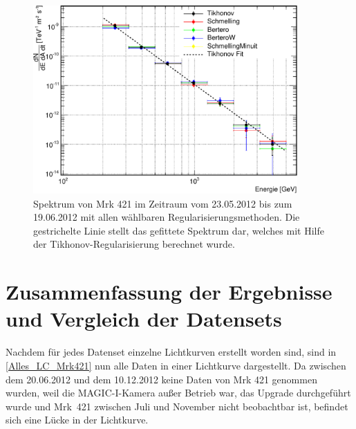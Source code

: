 \begin{figure}
    \centering
    \includegraphics[width=0.9\textwidth]{./Plots/04_MrkAnalyse/Datenset3/Datenset3_Mrk421_Spektrum.pdf}
    \caption{Spektrum von Mrk 421 im Zeitraum vom 23.05.2012 bis zum 19.06.2012 mit allen wählbaren Regularisierungsmethoden.
    Die gestrichelte Linie stellt das gefittete Spektrum dar, welches mit Hilfe der Tikhonov-Regularisierung berechnet wurde.}
    \label{Datenset3_Spektrum_Mrk421}
\end{figure}

\FloatBarrier


\section{Zusammenfassung der Ergebnisse und Vergleich der Datensets}
\label{LC_Alles}

Nachdem für jedes Datenset einzelne Lichtkurven erstellt worden sind, sind in \autoref{Alles_LC_Mrk421} nun alle Daten in einer Lichtkurve dargestellt.
Da zwischen dem 20.06.2012 und dem 10.12.2012 keine Daten von Mrk 421 genommen wurden, weil die MAGIC-I-Kamera außer Betrieb war, das Upgrade durchgeführt wurde und Mrk~421 zwischen Juli und November nicht beobachtbar ist, befindet sich eine Lücke in der Lichtkurve.

